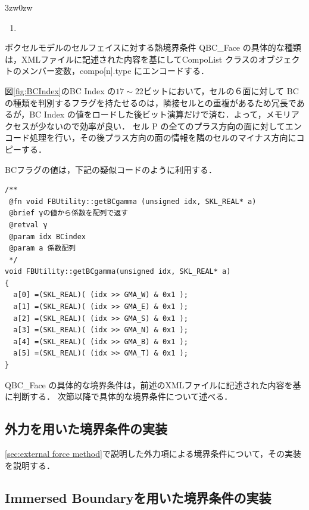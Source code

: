 \begin{indentation}{3zw}{0zw}
{\begin{enumerate}
\vspace{2mm}

\item 
\end{enumerate}



\vspace{20mm}

ボクセルモデルのセルフェイスに対する熱境界条件 QBC\_Face の具体的な種類は，XMLファイルに記述された内容を基にしてCompoList クラスのオブジェクトのメンバー変数，compo[n].type にエンコードする．

図\ref{fig:BCIndex}のBC Index の$17\sim22$ビットにおいて，セルの６面に対して BC の種類を判別するフラグを持たせるのは，隣接セルとの重複があるため冗長であるが，BC Index の値をロードした後ビット演算だけで済む．よって，メモリアクセスが少ないので効率が良い．
セル P の全てのプラス方向の面に対してエンコード処理を行い，その後プラス方向の面の情報を隣のセルのマイナス方向にコピーする．

BCフラグの値は，下記の疑似コードのように利用する．
{
\small
\begin{verbatim}
/**
 @fn void FBUtility::getBCgamma (unsigned idx, SKL_REAL* a)
 @brief γの値から係数を配列で返す
 @retval γ
 @param idx BCindex
 @param a 係数配列
 */
void FBUtility::getBCgamma(unsigned idx, SKL_REAL* a) 
{
  a[0] =(SKL_REAL)( (idx >> GMA_W) & 0x1 );
  a[1] =(SKL_REAL)( (idx >> GMA_E) & 0x1 );
  a[2] =(SKL_REAL)( (idx >> GMA_S) & 0x1 );
  a[3] =(SKL_REAL)( (idx >> GMA_N) & 0x1 );
  a[4] =(SKL_REAL)( (idx >> GMA_B) & 0x1 );
  a[5] =(SKL_REAL)( (idx >> GMA_T) & 0x1 );
}
\end{verbatim}
}
QBC\_Face の具体的な境界条件は，前述のXMLファイルに記述された内容を基に判断する．
次節以降で具体的な境界条件について述べる．
}
\end{indentation}







%
\subsection{外力を用いた境界条件の実装}
\label{sec:implementation external force}
\ref{sec:external force method}で説明した外力項による境界条件について，その実装を説明する．



%
\subsection{Immersed Boundaryを用いた境界条件の実装}
\label{sec:implementation of IB}


